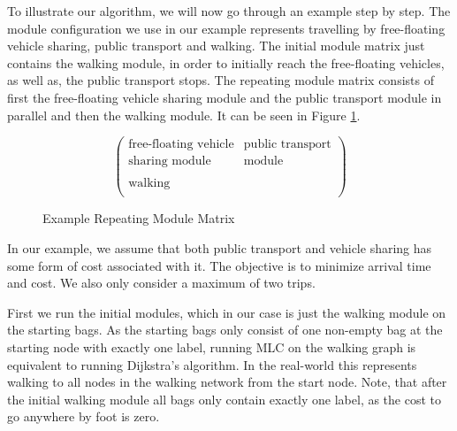 To illustrate our algorithm, we will now go through an example step by step.
The module configuration we use in our example represents travelling by free-floating vehicle sharing, public transport and walking.
The initial module matrix just contains the walking module, in order to initially reach the free-floating vehicles, as well as, the public transport stops.
The repeating module matrix consists of first the free-floating vehicle sharing module and the public transport module in parallel and then the walking module.
It can be seen in Figure \ref{fig:example_module_matrix}.


\begin{figure}[ht]
\centering
\[
\begin{pmatrix}
\text{free-floating vehicle} & \text{public transport} \\
\text{sharing module} & \text{module} \\
\\
\text{walking} & \\
\end{pmatrix}
\]
\caption{Example Repeating Module Matrix}
\label{fig:example_module_matrix}
\end{figure}

In our example, we assume that both public transport and vehicle sharing has some form of cost associated with it.
The objective is to minimize arrival time and cost.
We also only consider a maximum of two trips.

First we run the initial modules, which in our case is just the walking module on the starting bags.
As the starting bags only consist of one non-empty bag at the starting node with exactly one label, running MLC on the walking graph is equivalent to running Dijkstra's algorithm.
In the real-world this represents walking to all nodes in the walking network from the start node.
Note, that after the initial walking module all bags only contain exactly one label, as the cost to go anywhere by foot is zero.

